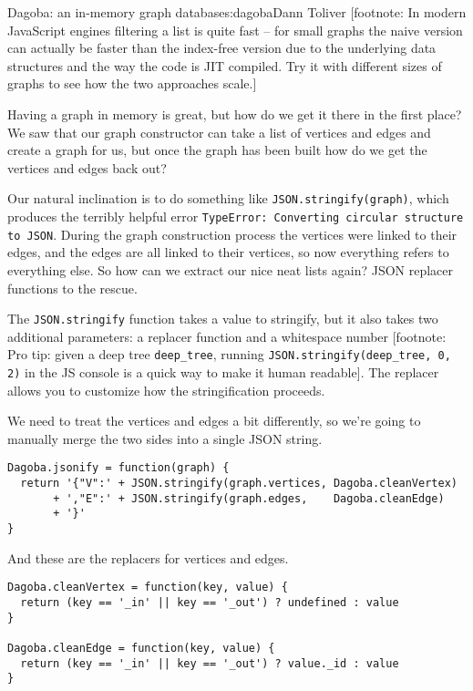 \begin{aosachapter}{Dagoba: an in-memory graph database}{s:dagoba}{Dann Toliver}
{[}footnote: In modern JavaScript engines filtering a list is quite fast
-- for small graphs the naive version can actually be faster than the
index-free version due to the underlying data structures and the way the
code is JIT compiled. Try it with different sizes of graphs to see how
the two approaches scale.{]}

\label{serialization}

Having a graph in memory is great, but how do we get it there in the
first place? We saw that our graph constructor can take a list of
vertices and edges and create a graph for us, but once the graph has
been built how do we get the vertices and edges back out?

Our natural inclination is to do something like
\texttt{JSON.stringify(graph)}, which produces the terribly helpful
error \texttt{TypeError: Converting circular structure to JSON}. During
the graph construction process the vertices were linked to their edges,
and the edges are all linked to their vertices, so now everything refers
to everything else. So how can we extract our nice neat lists again?
JSON replacer functions to the rescue.

The \texttt{JSON.stringify} function takes a value to stringify, but it
also takes two additional parameters: a replacer function and a
whitespace number {[}footnote: Pro tip: given a deep tree
\texttt{deep\_tree}, running \texttt{JSON.stringify(deep\_tree, 0, 2)}
in the JS console is a quick way to make it human readable{]}. The
replacer allows you to customize how the stringification proceeds.

We need to treat the vertices and edges a bit differently, so we're
going to manually merge the two sides into a single JSON string.

\begin{verbatim}
Dagoba.jsonify = function(graph) {
  return '{"V":' + JSON.stringify(graph.vertices, Dagoba.cleanVertex)
       + ',"E":' + JSON.stringify(graph.edges,    Dagoba.cleanEdge)
       + '}' 
}
\end{verbatim}

And these are the replacers for vertices and edges.

\begin{verbatim}
Dagoba.cleanVertex = function(key, value) {
  return (key == '_in' || key == '_out') ? undefined : value 
}

Dagoba.cleanEdge = function(key, value) {
  return (key == '_in' || key == '_out') ? value._id : value 
}
\end{verbatim}


\end{aosachapter}
